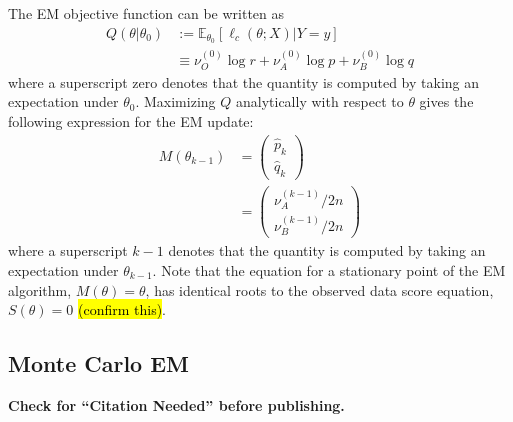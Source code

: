 \documentclass[11pt, oneside]{article}   	%
\newcommand{\bE}{\mathbb{E}}
\begin{document}
\begin{appendices}
    
    The EM objective function can be written as
    \begin{align}
		Q(\theta | \theta_0) &:= \bE_{\theta_0} [\ell_c (\theta; X) | Y=y]\\
		&\equiv \nu_O^{(0)} \log r + \nu_A^{(0)} \log p + \nu_B^{(0)} \log q
	\end{align}
    where a superscript zero denotes that the quantity is computed by taking an expectation under $\theta_0$. Maximizing $Q$ analytically with respect to $\theta$ gives the following expression for the EM update:
    \begin{align}
        M(\theta_{k-1}) &= \begin{pmatrix}
            \hat{p}_k\\ \hat{q}_k
        \end{pmatrix}\\
        &= \begin{pmatrix}
            \nu_A^{(k-1)} / 2n\\
            \nu_B^{(k-1)} / 2n
        \end{pmatrix}
    \end{align}
    where a superscript $k-1$ denotes that the quantity is computed by taking an expectation under $\theta_{k-1}$. Note that the equation for a stationary point of the EM algorithm, $M(\theta) = \theta$, has identical roots to the observed data score equation, $S(\theta) = 0$ \hl{(confirm this)}.


    \subsection{Monte Carlo EM}



\end{appendices}

\newpage

\textbf{Check for ``Citation Needed'' before publishing.}




\printindex
\end{document}
